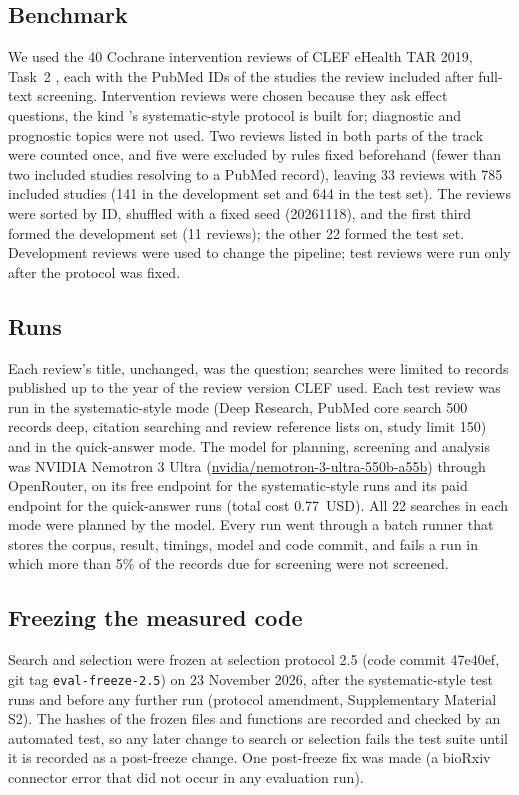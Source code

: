 \subsection{Benchmark}

We used the 40 Cochrane intervention reviews of CLEF eHealth TAR 2019, Task~2 \citep{kanoulas2019clef}, each with
the PubMed IDs of the studies the review included after full-text screening. Intervention reviews were chosen
because they ask effect questions, the kind \tool{}'s systematic-style protocol is built for; diagnostic and
prognostic topics were not used. Two reviews listed in both parts of the track were counted once, and five were
excluded by rules fixed beforehand (fewer than two included studies resolving to a PubMed record), leaving 33
reviews with 785 included studies (141 in the development set and 644 in the test set). The reviews were sorted by ID, shuffled with a fixed seed (20261118), and the first third formed the
development set (11 reviews); the other 22 formed the test set. Development reviews were used to change the
pipeline; test reviews were run only after the protocol was fixed.

\subsection{Runs}

Each review's title, unchanged, was the question; searches were limited to records published up to the year of the
review version CLEF used. Each test review was run in the systematic-style mode (Deep Research, PubMed core search
500 records deep, citation searching and review reference lists on, study limit 150) and in the quick-answer mode.
The model for planning, screening and analysis was NVIDIA Nemotron 3 Ultra (\url{nvidia/nemotron-3-ultra-550b-a55b})
through OpenRouter, on its free endpoint for the systematic-style runs and its paid endpoint for the quick-answer
runs (total cost 0.77~USD). All 22 searches in each mode were planned by the model. Every run went through a batch
runner that stores the corpus, result, timings, model and code commit, and fails a run in which more than 5\% of the
records due for screening were not screened.

\subsection{Freezing the measured code}

Search and selection were frozen at selection protocol 2.5 (code commit 47e40ef, git tag
\texttt{eval-freeze-2.5}) on 23 November 2026, after the systematic-style test runs and before any further run
(protocol amendment, Supplementary Material S2). The hashes of the frozen files and functions are recorded and
checked by an automated test, so any later change to search or selection fails the test suite until it is
recorded as a post-freeze change. One post-freeze fix was made (a bioRxiv connector error that did not occur in any
evaluation run).

